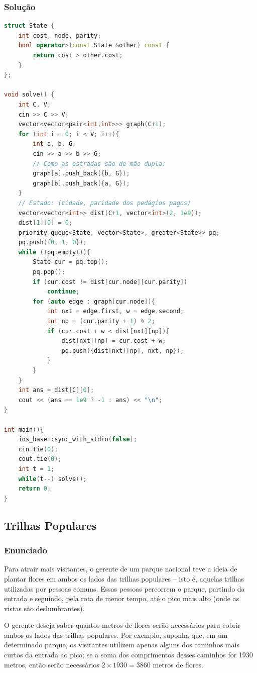 \subsubsection*{Solução}
\begin{lstlisting}[language=C++]
struct State {
    int cost, node, parity;
    bool operator>(const State &other) const {
        return cost > other.cost;
    }
};

void solve() {
    int C, V;
    cin >> C >> V;
    vector<vector<pair<int,int>>> graph(C+1);
    for (int i = 0; i < V; i++){
        int a, b, G;
        cin >> a >> b >> G;
        // Como as estradas são de mão dupla:
        graph[a].push_back({b, G});
        graph[b].push_back({a, G});
    }
    // Estado: (cidade, paridade dos pedágios pagos)
    vector<vector<int>> dist(C+1, vector<int>(2, 1e9));
    dist[1][0] = 0;
    priority_queue<State, vector<State>, greater<State>> pq;
    pq.push({0, 1, 0});
    while (!pq.empty()){
        State cur = pq.top();
        pq.pop();
        if (cur.cost != dist[cur.node][cur.parity])
            continue;
        for (auto edge : graph[cur.node]){
            int nxt = edge.first, w = edge.second;
            int np = (cur.parity + 1) % 2;
            if (cur.cost + w < dist[nxt][np]){
                dist[nxt][np] = cur.cost + w;
                pq.push({dist[nxt][np], nxt, np});
            }
        }
    }
    int ans = dist[C][0];
    cout << (ans == 1e9 ? -1 : ans) << "\n";
}

int main(){
    ios_base::sync_with_stdio(false);
    cin.tie(0);
    cout.tie(0);
    int t = 1;
    while(t--) solve();
    return 0;
}
\end{lstlisting}

\subsection{Trilhas Populares}

\subsubsection*{Enunciado}
Para atrair mais visitantes, o gerente de um parque nacional teve a ideia de plantar flores em ambos os lados das trilhas populares – isto é, aquelas trilhas utilizadas por pessoas comuns. Essas pessoas percorrem o parque, partindo da entrada e seguindo, pela rota de menor tempo, até o pico mais alto (onde as vistas são deslumbrantes). 

O gerente deseja saber quantos metros de flores serão necessários para cobrir ambos os lados das trilhas populares. Por exemplo, suponha que, em um determinado parque, os visitantes utilizem apenas alguns dos caminhos mais curtos da entrada ao pico; se a soma dos comprimentos desses caminhos for 1930 metros, então serão necessários \(2 \times 1930 = 3860\) metros de flores.

